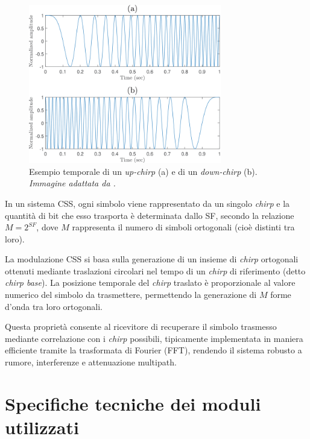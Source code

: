 \documentclass[12pt,a4paper,twoside]{book}
\begin{document}
\begin{figure}[H]
    \centering
    \includegraphics[width=0.75\textwidth]{img/up-chirp-down-chirp.png}
    \caption[Up-chirp e down-chirp]{%
        Esempio temporale di un \emph{up-chirp} (a) e di un \emph{down-chirp} (b).
        \textit{\tiny{Immagine adattata da \cite{10609524}.}}%
    }
    \label{fig:up-chirp-down-chirp}
\end{figure}

In un sistema CSS, ogni simbolo viene rappresentato da un singolo \emph{chirp} e
la quantità di bit che esso trasporta è determinata dallo \ac{SF}, secondo la relazione
$M = 2^{SF}$, dove $M$ rappresenta il numero di simboli ortogonali (cioè distinti
tra loro).

La modulazione \ac{CSS} si basa sulla generazione di un insieme di \emph{chirp}
ortogonali ottenuti mediante traslazioni circolari nel tempo di un \emph{chirp}
di riferimento (detto \emph{chirp base}). La posizione temporale del \emph{chirp}
traslato è proporzionale al valore numerico del simbolo da trasmettere, permettendo
la generazione di $M$ forme d'onda tra loro ortogonali.

Questa proprietà consente al ricevitore di recuperare il simbolo trasmesso mediante
correlazione con i \emph{chirp} possibili, tipicamente implementata in maniera efficiente
tramite la trasformata di Fourier (FFT), rendendo il sistema robusto a rumore,
interferenze e attenuazione multipath\cite{10609524}.

\section{Specifiche tecniche dei moduli utilizzati}
\end{document}
